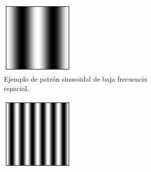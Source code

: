 \begin{figure}[!htbp]
    \centering
    \begin{subfigure}[b]{0.45\textwidth}
        \centering
        \includegraphics[width=\textwidth]{img/sin_baja_frec.png}
        \caption{Ejemplo de patrón sinusoidal de baja frecuencia espacial.}
        \label{fig:sinusoide_baja}
    \end{subfigure}
    \hfill
    \begin{subfigure}[b]{0.45\textwidth}
        \centering
        \includegraphics[width=\textwidth]{img/sin_alta_frec.png}

\end{subfigure}
\end{figure}
